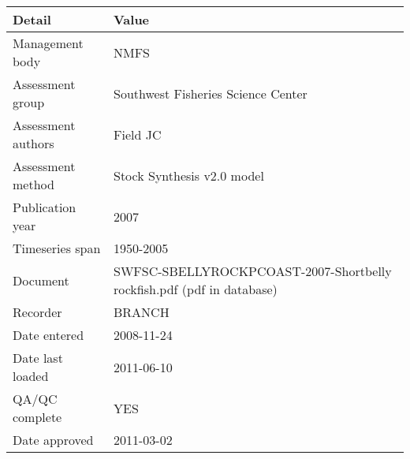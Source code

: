 \begin{table}[htb]
\centering
\begin{tabular}{lp{7cm}}
\toprule
Detail & Value \\
\midrule
Management body    & NMFS                                                                  \\
Assessment group   & Southwest Fisheries Science Center                                    \\
Assessment authors & Field JC                                                              \\
Assessment method  & Stock Synthesis v2.0 model                                            \\
Publication year   & 2007                                                                  \\
Timeseries span    & 1950-2005                                                             \\
Document           & SWFSC-SBELLYROCKPCOAST-2007-Shortbelly rockfish.pdf (pdf in database) \\
Recorder           & BRANCH                                                                \\
Date entered       & 2008-11-24                                                            \\
Date last loaded   & 2011-06-10                                                            \\
QA/QC complete     & YES                                                                   \\
Date approved      & 2011-03-02                                                            \\
\bottomrule
\end{tabular}
\label{tab:assessdet}
\end{table}
